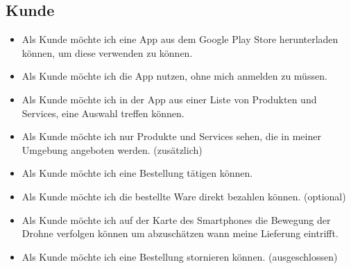 \subsection{Kunde}
\begin{itemize}
	\item Als Kunde möchte ich eine App aus dem Google Play Store herunterladen können, um diese verwenden zu können.
	\item Als Kunde möchte ich die App nutzen, ohne mich anmelden zu müssen.
	\item Als Kunde möchte ich in der App aus einer Liste von Produkten und Services, eine Auswahl treffen können.
	\item Als Kunde möchte ich nur Produkte und Services sehen, die in meiner Umgebung angeboten werden. (zusätzlich)
	\item Als Kunde möchte ich eine Bestellung tätigen können.
	\item Als Kunde möchte ich die bestellte Ware direkt bezahlen können. (optional)
	\item Als Kunde möchte ich auf der Karte des Smartphones die Bewegung der Drohne verfolgen können um abzuschätzen wann meine Lieferung eintrifft.
	\item Als Kunde möchte ich eine Bestellung stornieren können. (ausgeschlossen)
\end{itemize}

